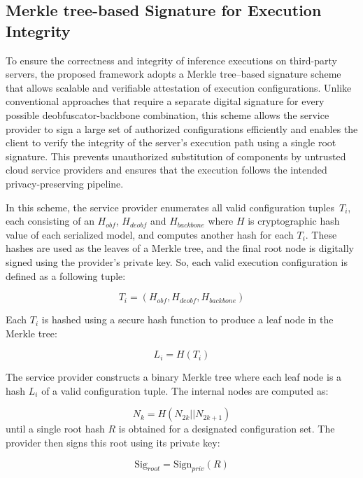 \documentclass{ieeeaccess}
\begin{document}
\subsection{Merkle tree-based Signature for Execution Integrity}

To ensure the correctness and integrity of inference executions on third-party servers, the proposed framework adopts a Merkle tree–based signature scheme that allows scalable and verifiable attestation of execution configurations. Unlike conventional approaches that require a separate digital signature for every possible deobfuscator-backbone combination, this scheme allows the service provider to sign a large set of authorized configurations efficiently and enables the client to verify the integrity of the server’s execution path using a single root signature. This prevents unauthorized substitution of components by untrusted cloud service providers and ensures that the execution follows the intended privacy-preserving pipeline.

In this scheme, the service provider enumerates all valid configuration tuples~$T_{i}$, each consisting of an $H_{obf}$, $H_{deobf}$ and $H_{backbone}$ where $H$ is cryptographic hash value of each serialized model, and computes another hash for each $T_i$. These hashes are used as the leaves of a Merkle tree, and the final root node is digitally signed using the provider's private key. So, each valid execution configuration is defined as a following tuple:

\begin{equation}
    T_i = (H_{obf},H_{deobf},H_{backbone})
\end{equation}

Each $T_{i}$ is hashed using a secure hash function to produce a leaf node in the Merkle tree:

\begin{equation}
    L_i=H(T_i)
\end{equation}

The service provider constructs a binary Merkle tree where each leaf node is a hash $L_i$ of a valid configuration tuple. The internal nodes are computed as:

\begin{equation}
    N_k=H(N_{2k}||N_{2k+1})
\end{equation}
until a single root hash $R$ is obtained for a designated configuration set. The provider then signs this root using its private key:

\begin{equation}
    \textrm{Sig}_{root} = \textrm{Sign}_{priv}(R)
\end{equation}
\end{document}
